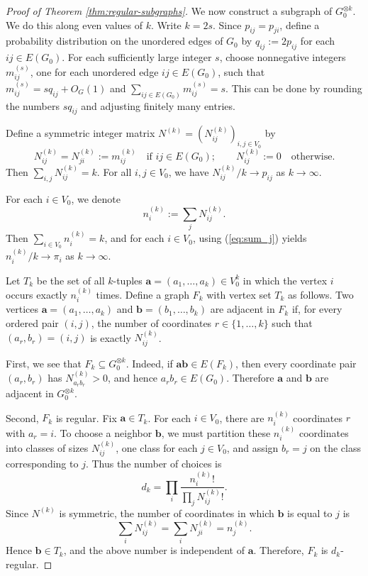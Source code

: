 \documentclass[11pt]{article}
\theoremstyle{definition}
\theoremstyle{plain}
\begin{document}
\begin{proof}[Proof of Theorem \ref{thm:regular-subgraphs}]
We now construct a subgraph of \(G_0^{\otimes k}\).  
We do this along even values of \(k\).  Write \(k=2s\).  Since
\(p_{ij}=p_{ji}\), define a probability distribution on the unordered edges of \(G_0\) by
        $q_{ij}:=2p_{ij}$ for each $ij\in E(G_0).$
For each sufficiently large integer \(s\), choose nonnegative integers
\(m_{ij}^{(s)}\), one for each unordered edge \(ij\in E(G_0)\), such that $m_{ij}^{(s)}=s q_{ij}+O_G(1)$ and 
        $\sum_{ij\in E(G_0)}m_{ij}^{(s)}=s$. This can be done by rounding the numbers \(s q_{ij}\) and adjusting
finitely many entries.

Define a symmetric integer matrix
\(N^{(k)}=(N_{ij}^{(k)})_{i,j\in V_0}\) by
\[ N_{ij}^{(k)}=N_{ji}^{(k)}:=m_{ij}^{(k)}
\quad\text{if }ij\in E(G_0);
\qquad
  N_{ij}^{(k)}:=0
\quad\text{otherwise}.
\]
Then $\sum_{i,j}N_{ij}^{(k)}=k$. 
For all \(i,j\in V_0\), we have ${N_{ij}^{(k)}}/{k}\to p_{ij}$ as $k\to\infty$.

For each \(i\in V_0\), we denote 
\[
        n_i^{(k)}:=\sum_j N_{ij}^{(k)}.
\]
Then $\sum_{i\in V_0} n_i^{(k)}=k$, and for each $i\in V_0$, using (\ref{eq:sum_j}) yields   
${n_i^{(k)}}/ {k}\to \pi_i$ as $k\to \infty$.

Let \(T_k\) be the set of all \(k\)-tuples $\bm a=(a_1,\dots,a_k)\in V_0^k$ in which the vertex \(i\) occurs exactly \(n_i^{(k)}\) times.  Define a
graph \(F_k\) with vertex set \(T_k\) as follows.  Two vertices
\(\bm a=(a_1,\dots,a_k)\) and \(\bm b=(b_1,\dots,b_k)\) are adjacent in
\(F_k\) if, for every ordered pair \((i,j)\), the number of coordinates
\(r\in\{1,\dots,k\}\) such that
$  (a_r,b_r)=(i,j)$ 
is exactly \(N_{ij}^{(k)}\).

First, we see that \(F_k\subseteq G_0^{\otimes k}\).  Indeed, if
\(\bm a\bm b\in E(F_k)\), then every coordinate pair \((a_r,b_r)\) has
\(N_{a_r b_r}^{(k)}>0\), and hence \(a_r b_r\in E(G_0)\).  Therefore
\(\bm a\) and \(\bm b\) are adjacent in \(G_0^{\otimes k}\).

Second, \(F_k\) is regular.  Fix \(\bm a\in T_k\).  For each \(i\in V_0\),
there are \(n_i^{(k)}\) coordinates \(r\) with \(a_r=i\).  To choose a
neighbor \(\bm b\), we must partition these \(n_i^{(k)}\) coordinates
into classes of sizes \(N_{ij}^{(k)}\), one class for each \(j\in V_0\),
and assign \(b_r=j\) on the class corresponding to \(j\).  Thus the
number of choices is
\[
        d_k
        =
        \prod_i
        \frac{n_i^{(k)}!}{\prod_j N_{ij}^{(k)}!}.
\]
Since \(N^{(k)}\) is symmetric, the number of coordinates in which
\(\bm b\) is equal to \(j\) is
\[
        \sum_i N_{ij}^{(k)}
        =
        \sum_i N_{ji}^{(k)}
        =
        n_j^{(k)}.
\]
Hence \(\bm b\in T_k\), and the above number is independent of
\(\bm a\).  Therefore, \(F_k\) is \(d_k\)-regular.


\end{proof}
\end{document}

